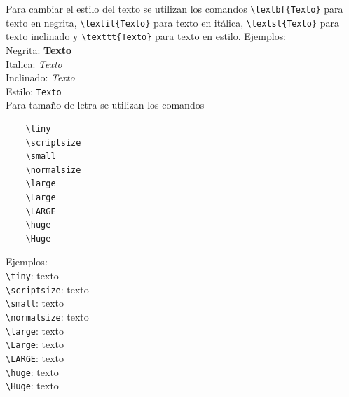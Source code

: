 \documentclass[10pt,journal,compsoc]{IEEEtran}
\begin{document}
Para cambiar el estilo del texto se utilizan los comandos \verb|\textbf{Texto}| para texto en negrita, \verb|\textit{Texto}| para texto en it\'alica, \verb|\textsl{Texto}| para texto inclinado y \verb|\texttt{Texto}| para texto en estilo. Ejemplos:\\
Negrita: \textbf{Texto}\\
Italica: \textit{Texto}\\
Inclinado: \textsl{Texto}\\
Estilo: \texttt{Texto}\\
Para tama\~no de letra se utilizan los comandos
\begin{lstlisting}
	\tiny
	\scriptsize
	\small
	\normalsize
	\large
	\Large
	\LARGE
	\huge
	\Huge
\end{lstlisting}
Ejemplos:\\
\verb|\tiny|: \tiny texto\\\normalsize
\verb|\scriptsize|: \scriptsize texto\\\normalsize
\verb|\small|: \small texto\\\normalsize
\verb|\normalsize|: \normalsize texto\\\normalsize
\verb|\large|: \large texto\\\normalsize
\verb|\Large|: \Large texto\\\normalsize
\verb|\LARGE|: \LARGE texto\\\normalsize
\verb|\huge|: \huge texto\\\normalsize
\verb|\Huge|: \Huge texto\\\normalsize
\normalsize
\end{document}
